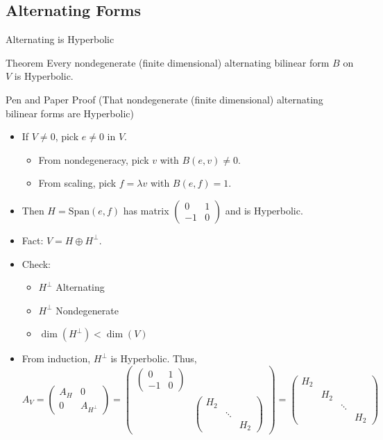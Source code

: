 \documentclass[svgnames]{beamer}
\begin{document}
\subsection{Alternating Forms}
\begin{frame}{Alternating is Hyperbolic}
\begin{block}{Theorem}
Every nondegenerate (finite dimensional) alternating bilinear form $B$ on $V$ is Hyperbolic. 
\end{block}
\end{frame}


\begin{frame}{Pen and Paper Proof {\tiny(That nondegenerate (finite dimensional) alternating bilinear forms are Hyperbolic)}}
\begin{itemize}[<+->]
\item If $V \neq 0$, pick $e \neq 0$ in $V$. 
\begin{itemize}
    \item From nondegeneracy, pick $v$ with $B(e,v)\neq 0$. 
    \item From scaling, pick $f=\lambda v$ with $B(e,f)=1$. 
\end{itemize}
\item Then $H=\text{Span}(e,f)$ has matrix $\begin{pmatrix}
    0 & 1 \\ -1 & 0
\end{pmatrix}$ and is Hyperbolic. 
\item Fact: $V = H \oplus H^\perp $. 
\item Check: 
\begin{itemize}
    \item $H^\perp$ Alternating
    \item $H^\perp$ Nondegenerate
    \item $\dim(H^\perp)<\dim(V)$
\end{itemize}
\item From induction, $H^\perp$ is Hyperbolic. 
\pause Thus, 
{\tiny \[A_V = \begin{pmatrix}
    A_H & 0\\
    0 & A_{H^\perp}
\end{pmatrix} = \begin{pmatrix}
    \begin{pmatrix}
    0 & 1 \\ -1 & 0
\end{pmatrix} & \\
& \begin{pmatrix}H_2 & &   \\   & \ddots &  \\ &   & H_2\end{pmatrix}
\end{pmatrix} = \begin{pmatrix}H_2 & &  &  \\ & H_2 &  &  \\ &  & \ddots &  \\ &  &  & H_2\end{pmatrix}
\]}
\end{itemize}
\end{frame}
\end{document}
